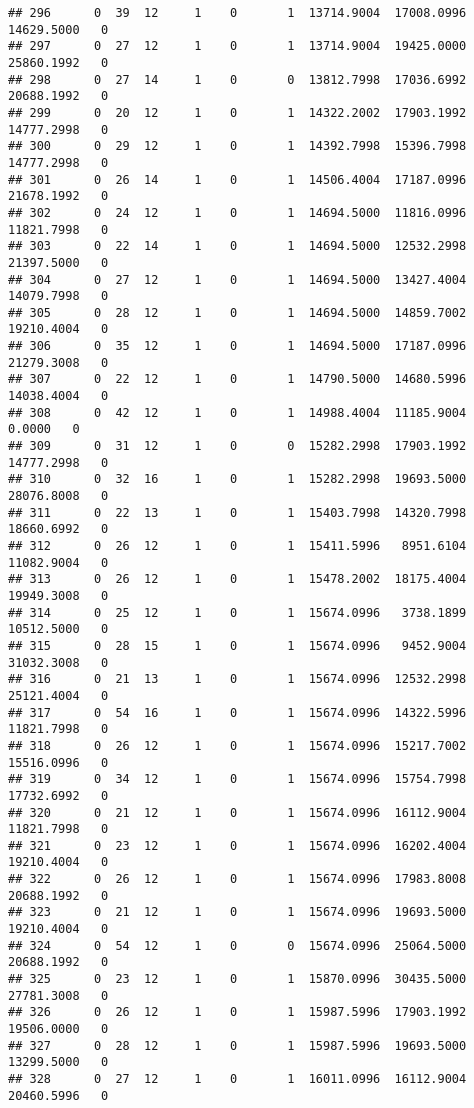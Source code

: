 \documentclass[
]{article}
\begin{document}
\begin{enumerate}
\begin{verbatim}
## 296      0  39  12     1    0       1  13714.9004  17008.0996  14629.5000   0
## 297      0  27  12     1    0       1  13714.9004  19425.0000  25860.1992   0
## 298      0  27  14     1    0       0  13812.7998  17036.6992  20688.1992   0
## 299      0  20  12     1    0       1  14322.2002  17903.1992  14777.2998   0
## 300      0  29  12     1    0       1  14392.7998  15396.7998  14777.2998   0
## 301      0  26  14     1    0       1  14506.4004  17187.0996  21678.1992   0
## 302      0  24  12     1    0       1  14694.5000  11816.0996  11821.7998   0
## 303      0  22  14     1    0       1  14694.5000  12532.2998  21397.5000   0
## 304      0  27  12     1    0       1  14694.5000  13427.4004  14079.7998   0
## 305      0  28  12     1    0       1  14694.5000  14859.7002  19210.4004   0
## 306      0  35  12     1    0       1  14694.5000  17187.0996  21279.3008   0
## 307      0  22  12     1    0       1  14790.5000  14680.5996  14038.4004   0
## 308      0  42  12     1    0       1  14988.4004  11185.9004      0.0000   0
## 309      0  31  12     1    0       0  15282.2998  17903.1992  14777.2998   0
## 310      0  32  16     1    0       1  15282.2998  19693.5000  28076.8008   0
## 311      0  22  13     1    0       1  15403.7998  14320.7998  18660.6992   0
## 312      0  26  12     1    0       1  15411.5996   8951.6104  11082.9004   0
## 313      0  26  12     1    0       1  15478.2002  18175.4004  19949.3008   0
## 314      0  25  12     1    0       1  15674.0996   3738.1899  10512.5000   0
## 315      0  28  15     1    0       1  15674.0996   9452.9004  31032.3008   0
## 316      0  21  13     1    0       1  15674.0996  12532.2998  25121.4004   0
## 317      0  54  16     1    0       1  15674.0996  14322.5996  11821.7998   0
## 318      0  26  12     1    0       1  15674.0996  15217.7002  15516.0996   0
## 319      0  34  12     1    0       1  15674.0996  15754.7998  17732.6992   0
## 320      0  21  12     1    0       1  15674.0996  16112.9004  11821.7998   0
## 321      0  23  12     1    0       1  15674.0996  16202.4004  19210.4004   0
## 322      0  26  12     1    0       1  15674.0996  17983.8008  20688.1992   0
## 323      0  21  12     1    0       1  15674.0996  19693.5000  19210.4004   0
## 324      0  54  12     1    0       0  15674.0996  25064.5000  20688.1992   0
## 325      0  23  12     1    0       1  15870.0996  30435.5000  27781.3008   0
## 326      0  26  12     1    0       1  15987.5996  17903.1992  19506.0000   0
## 327      0  28  12     1    0       1  15987.5996  19693.5000  13299.5000   0
## 328      0  27  12     1    0       1  16011.0996  16112.9004  20460.5996   0

\end{verbatim}
\end{enumerate}
\end{document}
